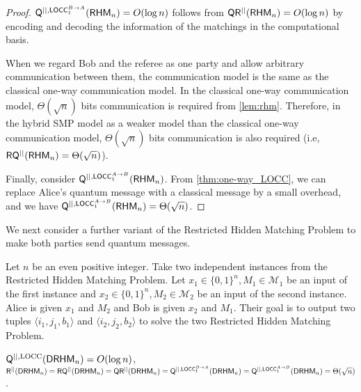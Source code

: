 \begin{proof}
    $\mathsf{Q}^{||,\mathsf{LOCC}_1^{B \rightarrow A}}(\mathsf{RHM}_n) = O(\log n)$ follows from $\mathsf{Q}\mathsf{R}^{||}(\mathsf{RHM}_n) = O(\log n)$ by encoding and decoding the information of the matchings in the computational basis.
    
    When we regard Bob and the referee as one party and allow arbitrary communication between them, the communication model is the same as the classical one-way communication model. In the classical one-way communication model, $\Theta(\sqrt{n})$ bits communication is required from \cref{lem:rhm}. Therefore, in the hybrid SMP model as a weaker model than the classical one-way communication model, $\Theta(\sqrt{n})$ bits communication is also required (i.e, $\mathsf{R}\mathsf{Q}^{||}(\mathsf{RHM}_n) = \Theta (\sqrt{n})$).
    
    Finally, consider $\mathsf{Q}^{||,\mathsf{LOCC}_1^{A \rightarrow B}}(\mathsf{RHM}_n)$. From \cref{thm:one-way_LOCC}, we can replace Alice's quantum message with a classical message by a small overhead, and we have $\mathsf{Q}^{||,\mathsf{LOCC}_1^{A \rightarrow B}}(\mathsf{RHM}_n) =  \Theta (\sqrt{n})$.
\end{proof}

We next consider a further variant of the Restricted Hidden Matching Problem to make both parties send quantum messages.

\begin{definition}
    Let $n$ be an even positive integer. Take two independent instances from the Restricted Hidden Matching Problem. Let $x_1 \in \{0, 1\}^n, M_1 \in \mathcal{M}_1$ be an input of the first instance and $x_2 \in \{0, 1\}^n, M_2 \in \mathcal{M}_2$ be an input of the second instance. Alice is given $x_1$ and $M_2$ and Bob is given $x_2$ and $M_1$. Their goal is to output two tuples $\langle i_1, j_1, b_1 \rangle$ and $\langle i_2, j_2, b_2 \rangle$ to solve the two Restricted Hidden Matching Problem.
\end{definition}

\begin{proposition}\label{prop:separation}
    $\mathsf{Q}^{||,\mathrm{LOCC}}(\mathsf{DRHM}_n) = O(\log n)$, $\mathsf{R}^{||} (\mathsf{DRHM}_n) = \mathsf{R}\mathsf{Q}^{||} (\mathsf{DRHM}_n) = \mathsf{Q}\mathsf{R}^{||} (\mathsf{DRHM}_n) = \mathsf{Q}^{||,\mathsf{LOCC}_1^{B \rightarrow A}}(\mathsf{DRHM}_n) = \mathsf{Q}^{||,\mathsf{LOCC}_1^{A \rightarrow B}}(\mathsf{DRHM}_n) =  \Theta(\sqrt{n})$.
\end{proposition}

